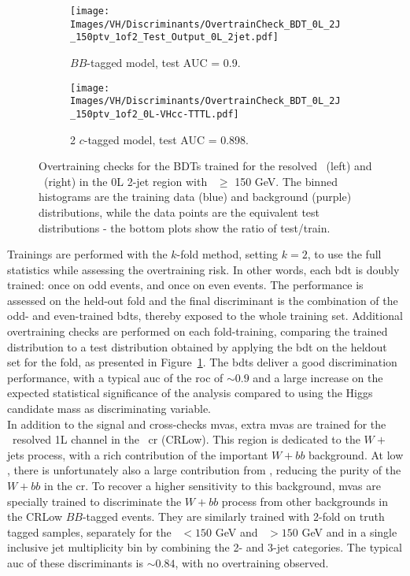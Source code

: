 \begin{figure}[h!]
    \hspace{-0.3cm}
    \begin{subfigure}[b]{0.49\textwidth}
        \centering
      \texttt{[image: Images/VH/Discriminants/OvertrainCheck\_BDT\_0L\_2J\_150ptv\_1of2\_Test\_Output\_0L\_2jet.pdf]}
    \caption{$BB$-tagged model, test AUC = 0.9.} 
    \end{subfigure}
    \begin{subfigure}[b]{0.49\textwidth}
        \centering
      \texttt{[image: Images/VH/Discriminants/OvertrainCheck\_BDT\_0L\_2J\_150ptv\_1of2\_0L-VHcc-TTTL.pdf]}
      \caption{2 $c$-tagged model, test AUC = 0.898.}
    \end{subfigure}
    \caption{Overtraining checks for the BDTs trained for the resolved \vhb\ (left) and \vhc\ (right) in the 0L 2-jet region with \ptv\ $\geq$ 150 GeV. The binned histograms are the training data (blue) and background (purple) distributions, while the data points are the equivalent test distributions - the bottom plots show the ratio of test/train.}
    \label{fig:overtrainingCheck}
\end{figure} 

Trainings are performed with the $k$-fold method, setting $k = 2$, to use the full statistics while assessing the overtraining risk. In other words, each \gls{bdt} is doubly trained: once on odd events, and once on even events. The performance is assessed on the held-out fold and the final discriminant is the combination of the odd- and even-trained \gls{bdt}s, thereby exposed to the whole training set. Additional overtraining checks are performed on each fold-training, comparing the trained distribution to a test distribution obtained by applying the \gls{bdt} on the heldout set for the fold, as presented in Figure~\ref{fig:overtrainingCheck}. The \gls{bdt}s deliver a good discrimination performance, with a typical \gls{auc} of the \gls{roc} of $\sim0.9$ and a large increase on the expected statistical significance of the analysis compared to using the Higgs candidate mass as discriminating variable. \\
  
In addition to the signal and cross-checks \gls{mva}s, extra \gls{mva}s are trained for the \vhb\ resolved 1L channel in the \lowdr\ \gls{cr} (CRLow). This region is dedicated to the $W+$jets process, with a rich contribution of the important $W+bb$ background. At low \ptv, there is unfortunately also a large contribution from \ttb, reducing the purity of the $W+bb$ in the \gls{cr}. To recover a higher sensitivity to this background, \gls{mva}s are specially trained to discriminate the $W+bb$ process from other backgrounds in the CRLow $BB$-tagged events. They are similarly trained with 2-fold on truth tagged samples, separately for the \ptv\ $< 150$ GeV and \ptv\ $> 150$ GeV and in a single inclusive jet multiplicity bin by combining the 2- and 3-jet categories. The typical \gls{auc} of these discriminants is $\sim0.84$, with no overtraining observed.

